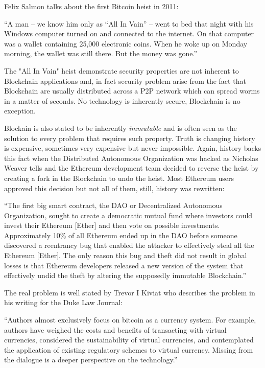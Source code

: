 \documentclass[..]{subfiles}
\begin{document}
Felix Salmon talks about the first Bitcoin heist in 2011:
\begin{displayquote}
	``A man -- we know him only as “All In Vain” -- went to bed that night with his Windows computer turned on and connected to the internet. On that computer was a wallet containing 25,000 electronic coins. When he woke up on Monday morning, the wallet was still there. But the money was gone.''
\end{displayquote}

The "All In Vain" heist demonstrate security properties are not inherent to Blockchain applications and, in fact security problem arise from the fact that Blockchain are usually distributed across a P2P network which can spread worms in a matter of seconds. No technology is inherently secure, Blockchain is no exception.

Blockain is also stated to be inherently \textit{immutable} and is often seen as the solution to every problem that requires such property. Truth is changing history is expensive, sometimes very expensive but never impossible. Again, history backs this fact when the Distributed Autonomous Organization was hacked as Nicholas Weaver tells and the Ethereum development team decided to reverse the heist by creating a fork in the Blockchain to undo the heist. Most Ethereum users approved this decision but not all of them, still, history was rewritten:
\begin{displayquote}
	``The first big smart contract, the DAO or Decentralized Autonomous Organization, sought to create a democratic mutual fund where investors could invest their Ethereum [Ether] and then vote on possible investments. Approximately 10\% of all Ethereum ended up in the DAO before someone discovered a reentrancy bug that enabled the attacker to effectively steal all the Ethereum [Ether]. The only reason this bug and theft did not result in global losses is that Ethereum developers released a new version of the system that effectively undid the theft by altering the supposedly immutable Blockchain.''\cite{weaver2018risks}
\end{displayquote}

The real problem is well stated by Trevor I Kiviat who describes the problem in his writing for the Duke Law Journal:
\begin{displayquote}
	``Authors almost exclusively focus on bitcoin as a currency system. For example, authors have weighed the costs and benefits of transacting with virtual currencies, considered the sustainability of virtual currencies, and contemplated the application of existing regulatory schemes to virtual currency. Missing from the dialogue is a deeper perspective on the technology.''
\end{displayquote}
\end{document}
